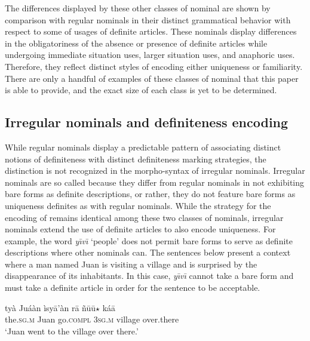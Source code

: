 \documentclass[output=paper,modfonts,nonflat]{langsci/langscibook}
\begin{document}
The differences displayed by these other classes of nominal are shown by comparison with regular nominals in their distinct grammatical behavior with respect to some of  usages of definite articles.  These nominals display differences in the obligatoriness of the absence or presence of definite articles while undergoing immediate situation uses, larger situation uses, and anaphoric uses.  Therefore, they reflect distinct styles of encoding either uniqueness or familiarity.  There are only a handful of examples of these classes of nominal that this paper is able to provide, and the exact size of each class is yet to be determined.

\subsection{Irregular nominals and definiteness encoding} \label{sec:cisneros:5.1}

While regular nominals display a predictable pattern of associating distinct notions of definiteness with distinct definiteness marking strategies, the distinction is not recognized in the morpho-syntax of irregular nominals.  Irregular nominals are so called because they differ from regular nominals in not exhibiting bare forms as definite descriptions, or rather, they do not feature bare forms as uniqueness definites as with regular nominals.  While the strategy for the encoding of  remains identical among these two classes of nominals, irregular nominals extend the use of definite articles to also encode uniqueness.  For example, the word \textit{y\=\i v\=\i} `people' does not permit bare forms to serve as definite descriptions where other nominals can.  The sentences below present a context where a man named Juan is visiting a village and is surprised by the disappearance of its inhabitants.  In this case, \textit{y\=\i v\=\i} cannot take a bare form and must take a definite article in order for the sentence to be acceptable.

\ea {}\label{ex:cisneros:73}
\gll
{\ob}ty\`a Ju\'a\`an{\cb} \`isy\=a'\`an r\=a {\ob}\~n\=u\=u$\star$ k\'a\=a{\cb}\\
{\db}the.\textsc{sg.m} Juan go.\textsc{compl} 3\textsc{sg.m} {\db}village over.there\\
\glt
`Juan went to the village over there.'
\end{document}
